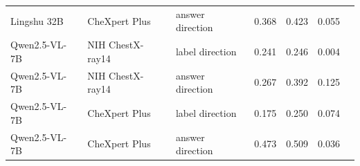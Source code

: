 \begin{table}[htbp]
{\begin{tabular}{lllcccc}
Lingshu 32B & CheXpert Plus & answer direction & 0.368 & 0.423 & 0.055 & \\
Qwen2.5-VL-7B & NIH ChestX-ray14 & label direction & 0.241 & 0.246 & 0.004 & \\
Qwen2.5-VL-7B & NIH ChestX-ray14 & answer direction & 0.267 & 0.392 & 0.125 & \\
Qwen2.5-VL-7B & CheXpert Plus & label direction & 0.175 & 0.250 & 0.074 & \\
Qwen2.5-VL-7B & CheXpert Plus & answer direction & 0.473 & 0.509 & 0.036 & \\
\bottomrule
\end{tabular}}
\end{table}
